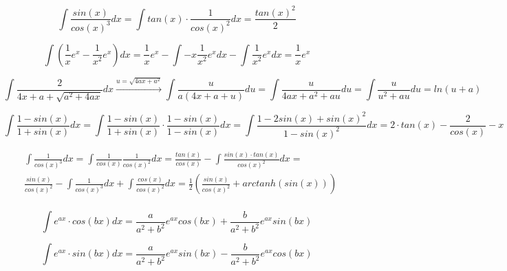 \documentclass[./\jobname.tex]{subfiles}
\begin{document}
\noindent\makebox[\linewidth]{\rule{\paperwidth}{0.4pt}}

\begin{equation*}
	\int \frac{sin(x)}{cos(x)^3} dx = \int tan(x) \cdot \frac{1}{cos(x)^2} dx = \frac{tan(x)^2}{2}
\end{equation*}

\noindent\makebox[\linewidth]{\rule{\paperwidth}{0.4pt}}

\begin{equation*}
	\int \left( \frac{1}{x} e^x - \frac{1}{x^2} e^x \right) dx = \frac{1}{x} e^x - \int -x \frac{1}{x^2} e^x dx - \int \frac{1}{x^2} e^x dx = \frac{1}{x} e^x
\end{equation*}

\noindent\makebox[\linewidth]{\rule{\paperwidth}{0.4pt}}

\begin{equation*}
	\int \frac{2}{4x + a + \sqrt{a^2 + 4ax}} dx \xrightarrow{u = \sqrt{4ax + a^2}} \int \frac{u}{a(4x + a + u)} du = \int \frac{u}{4 ax + a^2 + au} du = \int \frac{u}{u^2 + au} du = ln(u + a)
\end{equation*}

\noindent\makebox[\linewidth]{\rule{\paperwidth}{0.4pt}}

\begin{equation*} 
\int \frac{1 - sin(x)}{1 + sin(x)} dx = \int \frac{1 - sin(x)}{1 + sin(x)} \cdot \frac{1 - sin(x)}{1 - sin(x)} dx = \int \frac{1 - 2 sin(x) + sin(x)^2}{1 - sin(x)^2} dx = 2 \cdot tan(x) - \frac{2}{cos(x)} - x
\end{equation*}

\noindent\makebox[\linewidth]{\rule{\paperwidth}{0.4pt}}

\begin{equation*}
	\begin{split}
	& \int \frac{1}{cos(x)^3} dx = \int \frac{1}{cos(x)} \frac{1}{cos(x)^2} dx = \frac{tan(x)}{cos(x)} - \int \frac{sin(x) \cdot tan(x)}{cos(x)^2} dx = \\ 
	& \frac{sin(x)}{cos(x)^2} - \int \frac{1}{cos(x)^3} dx + \int \frac{cos(x)}{cos(x)^2} dx = \frac{1}{2} \left( \frac{sin(x)}{cos(x)^2} + arctanh(sin(x)) \right) \\
	\end{split}
\end{equation*}

\noindent\makebox[\linewidth]{\rule{\paperwidth}{0.4pt}}

\begin{equation*}
	\int e^{ax} \cdot cos(bx) dx = \frac{a}{a^2 + b^2} e^{ax} cos(bx) + \frac{b}{a^2 + b^2} e^{ax} sin(bx)
\end{equation*}

\noindent\makebox[\linewidth]{\rule{\paperwidth}{0.4pt}}

\begin{equation*}
\int e^{ax} \cdot sin(bx) dx = \frac{a}{a^2 + b^2} e^{ax} sin(bx) - \frac{b}{a^2 + b^2} e^{ax} cos(bx)
\end{equation*}

\noindent\makebox[\linewidth]{\rule{\paperwidth}{0.4pt}}

\newpage
\end{document}
